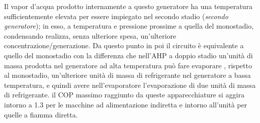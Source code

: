 Il vapor d'acqua prodotto internamente a questo generatore ha una temperatura sufficientemente elevata per essere impiegato nel secondo stadio (\emph{secondo generatore}); in esso, a temperatura e pressione prossime a quella del monostadio, condensando realizza, senza ulteriore spesa, un'ulteriore concentrazione/generazione. Da questo punto in poi il circuito è equivalente a quello del monostadio con la differenza che nell'AHP a doppio stadio un'unità di massa prodotta nel generatore ad alta temperatura può fare evaporare , rispetto al monostadio, un'ulteriore unità di massa di refrigerante nel generatore a bassa temperatura, e quindi avere nell'evaporatore l'evaporazione di due unità di massa di refrigerante. il COP massimo raggiunto da queste apparecchiature si aggira intorno a \num{1.3} per le macchine ad alimentazione indiretta e intorno all'unità per quelle a fiamma diretta.

